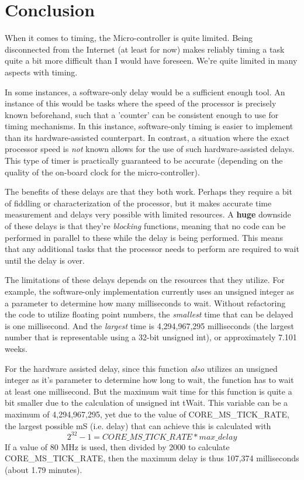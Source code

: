 \documentclass[a4paper, 12pt]{article}
\begin{document}
\section{Conclusion}
When it comes to timing, the Micro-controller is quite limited. Being disconnected from the Internet (at least for now) makes reliably timing a task quite a bit more difficult than I would have foreseen. We're quite limited in many aspects with timing.

In some instances, a software-only delay would be a sufficient enough tool. An instance of this would be tasks where the speed of the processor is precisely known beforehand, such that a 'counter' can be consistent enough to use for timing mechanisms. In this instance, software-only timing is easier to implement than its hardware-assisted counterpart. In contrast, a situation where the exact processor speed is \textit{not} known allows for the use of such hardware-assisted delays. This type of timer is practically guaranteed to be accurate (depending on the quality of the on-board clock for the micro-controller).

The benefits of these delays are that they both work. Perhaps they require a bit of fiddling or characterization of the processor, but it makes accurate time measurement and delays very possible with limited resources. A \textbf{huge} downside of these delays is that they're \textit{blocking} functions, meaning that no code can be performed in parallel to these while the delay is being performed. This means that any additional tasks that the processor needs to perform are required to wait until the delay is over.

The limitations of these delays depends on the resources that they utilize. For example, the software-only implementation currently uses an unsigned integer as a parameter to determine how many milliseconds to wait. Without refactoring the code to utilize floating point numbers, the \textit{smallest} time that can be delayed is one millisecond. And the \textit{largest} time is 4,294,967,295 milliseconds (the largest number that is representable using a 32-bit unsigned int), or approximately 7.101 weeks.

For the hardware assisted delay, since this function \textit{also} utilizes an unsigned integer as it's parameter to determine how long to wait, the function has to wait at least one millisecond. But the maximum wait time for this function is quite a bit smaller due to the calculation of unsigned int tWait. This variable can be a maximum of 4,294,967,295, yet due to the value of CORE\_MS\_TICK\_RATE, the largest possible mS (i.e. delay) that can achieve this is calculated with $$2^{32}-1=CORE\_MS\_TICK\_RATE*max\_delay$$ If a value of 80 MHz is used, then divided by 2000 to calculate \linebreak CORE\_MS\_TICK\_RATE, then the maximum delay is thus 107,374 milliseconds (about 1.79 minutes).
\end{document}
